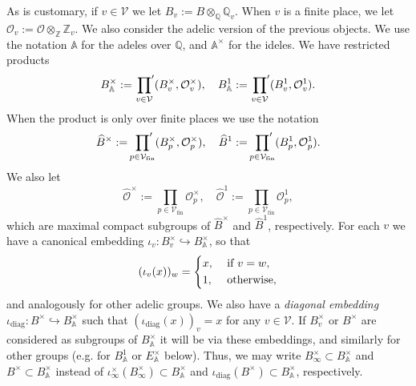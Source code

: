 \documentclass{article}
\theoremstyle{named}
\newcommand{\Z}{\mathbb{Z}}
\newcommand{\A}{\mathbb{A}}
\newcommand{\Q}{\mathbb{Q}}
\renewcommand{\O}{\mathcal{O}}
\newcommand{\Pl}{\mathcal{V}}
\newcommand{\Primes}{\mathcal{V}_{\text{fin}}}
\DeclareMathOperator{\diag}{diag}
\begin{document}
As is customary, if $v \in \Pl$ we let $B_v := B \otimes_\Q \Q_v$. When $v$ is a finite place, we let $\O_v := \O \otimes_\Z \Z_v$. We also consider the adelic version of the previous objects. We use the notation $\A$ for the adeles over $\Q$, and $\A^\times$ for the ideles. We have restricted products
\begin{equation*}
    B_\A^\times := \sideset{}{'}\prod_{v \in \Pl}(B_v^\times, \O_v^\times), \quad B_\A^1 := \sideset{}{'}\prod_{v \in \Pl}(B_v^1, \O_v^1).
\end{equation*}
When the product is only over finite places we use the notation
\begin{equation*}
    \widehat{B}^\times := \sideset{}{'}\prod_{p \in \Primes}(B_p^\times, \O_p^\times), \quad \widehat{B}^1 := \sideset{}{'}\prod_{p \in \Primes}(B_p^1, \O_p^1).
\end{equation*}
We also let 
\begin{equation*}
    \widehat{\O}^\times := \prod_{p \in \Primes} \O_p^\times, \quad \widehat{\O}^1 := \prod_{p \in \Primes} \O_p^1,
\end{equation*}
which are maximal compact subgroups of $\widehat{B}^\times$ and $\widehat{B}^1$, respectively. For each $v$ we have a canonical embedding $\iota_v: B^\times_v \hookrightarrow B_\A^\times$, so that 
\begin{equation*}
    (\iota_v(x))_{w} = \begin{dcases}
        x, & \text{ if } v = w,\\
        1, & \text{ otherwise},
    \end{dcases}
\end{equation*}
and analogously for other adelic groups. We also have a \emph{diagonal embedding} $\iota_{\diag}: B^\times \hookrightarrow B_\A^\times$ such that $(\iota_{\diag}(x))_v = x$ for any $v \in \Pl$. If $B_v^\times$ or $B^\times$ are considered as subgroups of $B_\A^\times$ it will be via these embeddings, and similarly for other groups (e.g. for $B_\A^1$ or $E_\A^\times$ below). Thus, we may write $B_\infty^\times \subset B_\A^\times$ and $B^\times \subset B_\A^\times$ instead of $\iota_\infty^\times(B_\infty^\times) \subset B_\A^\times$ and $\iota_{\diag}(B^\times)\subset B_\A^\times$, respectively.
\end{document}
